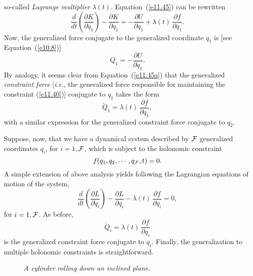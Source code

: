 so-called {\em Lagrange multiplier}\/ $\lambda(t)$. 
Equation~(\ref{e11.45}) can be rewritten
\begin{equation}\label{e11.45a}
\frac{d}{dt}\!\left(\frac{\partial K}{\partial \dot{q}_1}\right)-\frac{\partial K}{\partial q_1} =-  \frac{\partial U}{\partial q_1}+ \lambda(t)\,\frac{\partial f}{\partial q_1}.
\end{equation}
Now, the generalized force conjugate to
the generalized coordinate $q_1$ is  [see Equation~(\ref{e10.8})]
\begin{equation}
Q_1 = -\frac{\partial U}{\partial q_1}.
\end{equation}
By analogy, it seems clear from Equation~(\ref{e11.45a}) that the generalized {\em constraint force}\/ [{\em i.e.}, the generalized force responsible for maintaining the constraint
(\ref{e11.40})] conjugate to $q_1$ takes the form
\begin{equation}
\tilde{Q}_1 = \lambda(t)\,\frac{\partial f}{\partial q_1},
\end{equation}
with a similar expression for the generalized constraint force conjugate to $q_2$.

Suppose, now, that we have a dynamical system described by ${\cal F}$
generalized coordinates $q_i$, for $i=1,{\cal F}$, which is subject to the
holonomic constraint
\begin{equation}
f(q_1,q_2,\cdots,q_{\cal F},t) = 0.
\end{equation}
A simple extension of above analysis yields following the Lagrangian equations of motion of the
system,
\begin{equation}\label{e11.50}
\frac{d}{dt}\!\left(\frac{\partial L}{\partial \dot{q}_i}\right)-\frac{\partial L}{\partial q_i} - \lambda(t)\,\frac{\partial f}{\partial q_i} = 0,
\end{equation}
for $i=1,{\cal F}$. As before,
\begin{equation}
\tilde{Q}_i = \lambda(t)\,\frac{\partial f}{\partial q_i}
\end{equation}
is the generalized constraint force conjugate to $q_i$. 
Finally, the generalization to multiple holonomic constraints is straightforward. 

\begin{figure}[h]
\epsfysize=2.5in
\centerline{}
\caption{\em A cylinder rolling down an inclined plane.}\label{wedge}
\end{figure}


